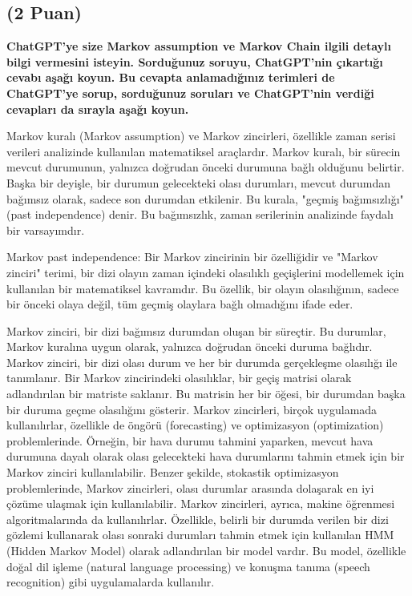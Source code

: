 \documentclass[11pt]{article}
\begin{document}
\subsection{(2 Puan)} \textbf{ChatGPT’ye size Markov assumption ve Markov Chain ilgili detaylı bilgi vermesini isteyin. Sorduğunuz soruyu, ChatGPT'nin çıkartığı cevabı aşağı koyun. Bu cevapta anlamadığınız terimleri de ChatGPT’ye sorup, sorduğunuz soruları ve ChatGPT’nin verdiği cevapları da sırayla aşağı koyun.}

Markov kuralı (Markov assumption) ve Markov zincirleri, özellikle zaman serisi verileri analizinde kullanılan matematiksel araçlardır.
Markov kuralı, bir sürecin mevcut durumunun, yalnızca doğrudan önceki durumuna bağlı olduğunu belirtir. Başka bir deyişle, bir durumun gelecekteki olası durumları, mevcut durumdan bağımsız olarak, sadece son durumdan etkilenir. Bu kurala, "geçmiş bağımsızlığı" (past independence) denir. Bu bağımsızlık, zaman serilerinin analizinde faydalı bir varsayımdır.

Markov past independence: Bir Markov zincirinin bir özelliğidir ve "Markov zinciri" terimi, bir dizi olayın zaman içindeki olasılıklı geçişlerini modellemek için kullanılan bir matematiksel kavramdır. Bu özellik, bir olayın olasılığının, sadece bir önceki olaya değil, tüm geçmiş olaylara bağlı olmadığını ifade eder.

Markov zinciri, bir dizi bağımsız durumdan oluşan bir süreçtir. Bu durumlar, Markov kuralına uygun olarak, yalnızca doğrudan önceki duruma bağlıdır. Markov zinciri, bir dizi olası durum ve her bir durumda gerçekleşme olasılığı ile tanımlanır. Bir Markov zincirindeki olasılıklar, bir geçiş matrisi olarak adlandırılan bir matriste saklanır. Bu matrisin her bir öğesi, bir durumdan başka bir duruma geçme olasılığını gösterir.
Markov zincirleri, birçok uygulamada kullanılırlar, özellikle de öngörü (forecasting) ve optimizasyon (optimization) problemlerinde. Örneğin, bir hava durumu tahmini yaparken, mevcut hava durumuna dayalı olarak olası gelecekteki hava durumlarını tahmin etmek için bir Markov zinciri kullanılabilir. Benzer şekilde, stokastik optimizasyon problemlerinde, Markov zincirleri, olası durumlar arasında dolaşarak en iyi çözüme ulaşmak için kullanılabilir.
Markov zincirleri, ayrıca, makine öğrenmesi algoritmalarında da kullanılırlar. Özellikle, belirli bir durumda verilen bir dizi gözlemi kullanarak olası sonraki durumları tahmin etmek için kullanılan HMM (Hidden Markov Model) olarak adlandırılan bir model vardır. Bu model, özellikle doğal dil işleme (natural language processing) ve konuşma tanıma (speech recognition) gibi uygulamalarda kullanılır.
\end{document}
